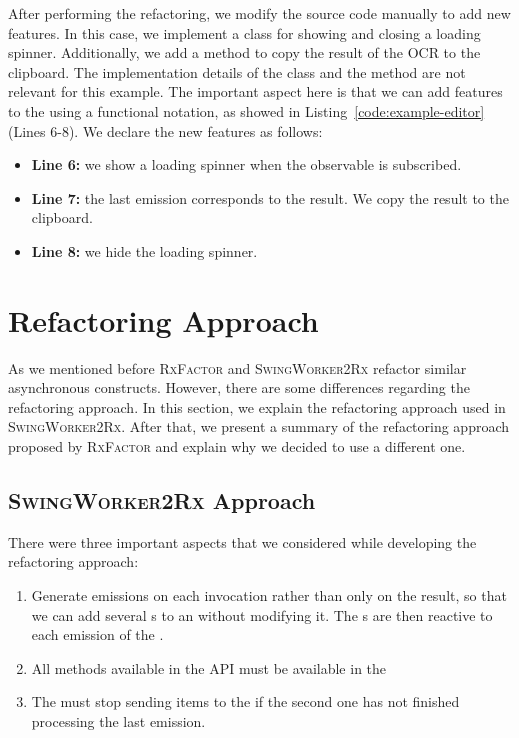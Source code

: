 \documentclass[type=bsc,accentcolor=tud9c]{tudthesis}
\newcommand{\toolextension}{\textsc{SwingWorker2Rx}}
\begin{document}
After performing the refactoring, we modify the source code manually to add new features. In this case, we implement a  class for showing and closing a loading spinner. Additionally, we add a method to copy the result of the OCR to the clipboard. The implementation details of the  class and the  method are not relevant for this example. The important aspect here is that we can add features to the  using a functional notation, as showed in Listing~\ref{code:example-editor} (Lines 6-8). We declare the new features as follows:
\begin{itemize}
	\item {\bf Line 6:} we show a loading spinner when the observable is subscribed.
	\item {\bf Line 7:} the last emission corresponds to the result. We copy the result to the clipboard.
	\item {\bf Line 8:} we hide the loading spinner.
\end{itemize}

\section{Refactoring Approach}
As we mentioned before \textsc{RxFactor} and \toolextension{} refactor similar asynchronous constructs. However, there are some differences regarding the refactoring approach. In this section, we explain the refactoring approach used in \toolextension{}. After that, we present a summary of the refactoring approach proposed by \textsc{RxFactor} and explain why we decided to use a different one.

\subsection{\toolextension{} Approach}
\label{sec:2rx-approach}
There were three important aspects that we considered while developing the refactoring approach:
\begin{enumerate}
	\item Generate emissions on each  invocation rather than only on the result, so that we can add several s to an  without modifying it. The s are then reactive to each emission of the .
	\item All methods available in the  API must be available in the 
	\item The  must stop sending items to the  if the second one has not finished processing the last emission.
\end{enumerate}
\end{document}
